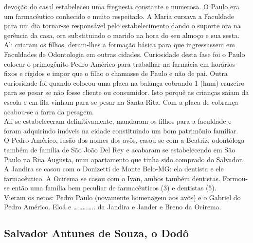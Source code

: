 \documentclass[12pt,brazil,]{book}
\begin{document}
devoção do casal estabeleceu uma freguesia constante e numerosa. O Paulo
era um farmacêutico conhecido e muito respeitado. A Maria cursava a
Faculdade para um dia tornar-se responsável pelo estabelecimento dando o
suporte ora na gerência da casa, ora substituindo o marido na hora do
seu almoço e sua sesta. Ali criaram os filhos, deram-lhes a formação
básica para que ingressassem em Faculdades de Odontologia em outras
cidades. Curiosidade desta fase foi o Paulo colocar o primogênito Pedro
Américo para trabalhar na farmácia em horários fixos e rígidos e impor
que o filho o chamasse de Paulo e não de pai. Outra curiosidade foi
quando colocou uma placa na balança cobrando 1 (hum) cruzeiro para se
pesar se não fosse cliente ou consumidor. Isto porquê as crianças saíam
da escola e em fila vinham para se pesar na Santa Rita. Com a placa de
cobrança acabou-se a farra da pesagem.\\
Ali se estabeleceram definitivamente, mandaram os filhos para a
faculdade e foram adquirindo imóveis na cidade constituindo um bom
patrimônio familiar.\\
O Pedro Américo, fusão dos nomes dos avôs, casou-se com a Beatriz,
odontóloga também de família de São João Del Rey e acabaram se
estabelecendo em São Paulo na Rua Augusta, num apartamento que tinha
sido comprado do Salvador. A Jandira se casou com o Donizetti de Monte
Belo-MG: ela dentista e ele farmacêutico. A Ocirema se casou com o Ivan,
ambos também dentistas. Formou-se então uma família bem peculiar de
farmacêuticos (3) e dentistas (5).\\
Vieram os netos: Pedro Paulo (novamente homenagem aos avôs) e o Gabriel
do Pedro Américo. Eloá e \ldots{}\ldots{}\ldots{}\ldots{}.. da Jandira e
Jander e Breno da Ocirema.

\subsection{Salvador Antunes de Souza, o
Dodô}\label{salvador-antunes-de-souza-o-doduxf4}
\end{document}
